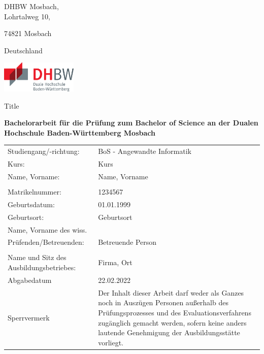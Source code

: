 \def\title{Title}
\def\author{Vorname Nachname}

\begin{titlepage}


\begin{minipage}[t]{0.25\textwidth}
DHBW Mosbach,\\

Lohrtalweg 10,

74821 Mosbach

Deutschland
\end{minipage}
\hfill
\begin{minipage}[t]{0.25\textwidth}
\includegraphics[height=1.5cm]{prefix/image/logo-dhbw.eps}
\end{minipage}




\begin{center}
	\vspace{5mm}
	
	\huge \title
	
	\vspace{50pt}
	
	\large \bfseries Bachelorarbeit für die Prüfung zum Bachelor of Science an der Dualen Hochschule Baden-Württemberg Mosbach

	
\end{center}

\vspace{15pt}

\begin{tabular}{ll}
         Studiengang/-richtung:       	& BoS - Angewandte Informatik   \\
         Kurs:                 			& Kurs    						\\
         Name, Vorname:                 & Name, Vorname          	 	\\
        \\
         Matrikelnummer:        		& 1234567        				\\
         Geburtsdatum:      			& 01.01.1999        			\\
         Geburtsort:					& Geburtsort					\\
         Name, Vorname des wiss.\\ Prüfenden/Betreuenden: & Betreuende Person \\
        \\
         Name und Sitz des Ausbildungsbetriebes:	& Firma, Ort		\\
         Abgabedatum		& 22.02.2022		\\
         Sperrvermerk		& Der Inhalt dieser Arbeit darf weder als Ganzes noch in Auszügen Personen außerhalb des Prüfungsprozesses und des Evaluationsverfahrens zugänglich gemacht werden, sofern keine anders lautende Genehmigung der Ausbildungsstätte vorliegt.  \\
    \end{tabular}


\vspace{49.7pt}


\end{titlepage}
